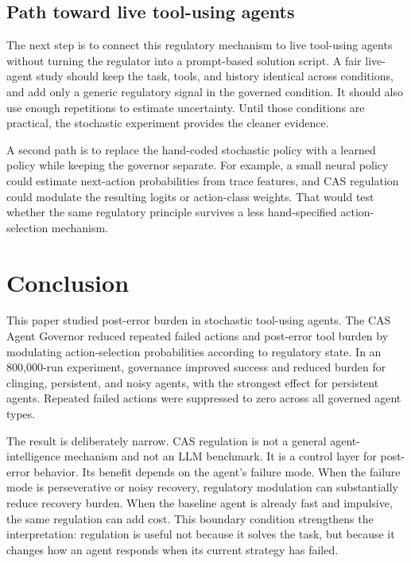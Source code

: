\documentclass[11pt]{article}
\begin{document}
\subsection{Path toward live tool-using agents}

The next step is to connect this regulatory mechanism to live tool-using agents without turning the regulator into a prompt-based solution script. A fair live-agent study should keep the task, tools, and history identical across conditions, and add only a generic regulatory signal in the governed condition. It should also use enough repetitions to estimate uncertainty. Until those conditions are practical, the stochastic experiment provides the cleaner evidence.

A second path is to replace the hand-coded stochastic policy with a learned policy while keeping the governor separate. For example, a small neural policy could estimate next-action probabilities from trace features, and CAS regulation could modulate the resulting logits or action-class weights. That would test whether the same regulatory principle survives a less hand-specified action-selection mechanism.

\section{Conclusion}

This paper studied post-error burden in stochastic tool-using agents. The CAS Agent Governor reduced repeated failed actions and post-error tool burden by modulating action-selection probabilities according to regulatory state. In an 800,000-run experiment, governance improved success and reduced burden for clinging, persistent, and noisy agents, with the strongest effect for persistent agents. Repeated failed actions were suppressed to zero across all governed agent types.

The result is deliberately narrow. CAS regulation is not a general agent-intelligence mechanism and not an LLM benchmark. It is a control layer for post-error behavior. Its benefit depends on the agent's failure mode. When the failure mode is perseverative or noisy recovery, regulatory modulation can substantially reduce recovery burden. When the baseline agent is already fast and impulsive, the same regulation can add cost. This boundary condition strengthens the interpretation: regulation is useful not because it solves the task, but because it changes how an agent responds when its current strategy has failed.
\end{document}
